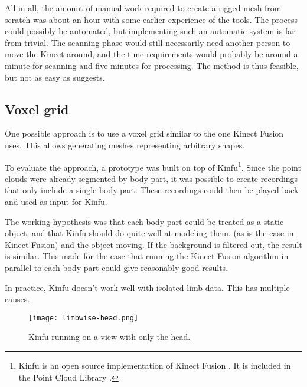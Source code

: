 All in all, the amount of manual work required to create a rigged mesh from scratch was about an hour with some earlier experience of the tools. The process could possibly be automated, but implementing such an automatic system is far from trivial. The scanning phase would still necessarily need another person to move the Kinect around, and the time requirements would probably be around a minute for scanning and five minutes for processing. The method is thus feasible, but not as easy as \citet{charpentier2011accurate} suggests.

\subsection{Voxel grid}

One possible approach is to use a voxel grid similar to the one Kinect Fusion \citep{} uses. This allows generating meshes representing arbitrary shapes.

To evaluate the approach, a prototype was built on top of Kinfu\footnote{Kinfu is an open source implementation of Kinect Fusion \citep{newcombe2011kinectfusion}. It is included in the Point Cloud Library \citep{PCL}.}. Since the point clouds were already segmented by body part, it was possible to create recordings that only include a single body part. These recordings could then be played back and used as input for Kinfu.

The working hypothesis was that each body part could be treated as a static object, and that Kinfu should do quite well at modeling them.  (as is the case in Kinect Fusion) and the object moving. If the background is filtered out, the result is similar. This made for the case that running the Kinect Fusion algorithm in parallel to each body part could give reasonably good results.

In practice, Kinfu doesn't work well with isolated limb data. This has multiple causes. 

\begin{figure}
    \centering
    \texttt{[image: limbwise-head.png]}
    \caption{Kinfu running on a view with only the head.}
    \label{fig:limbwise-head}
\end{figure}

